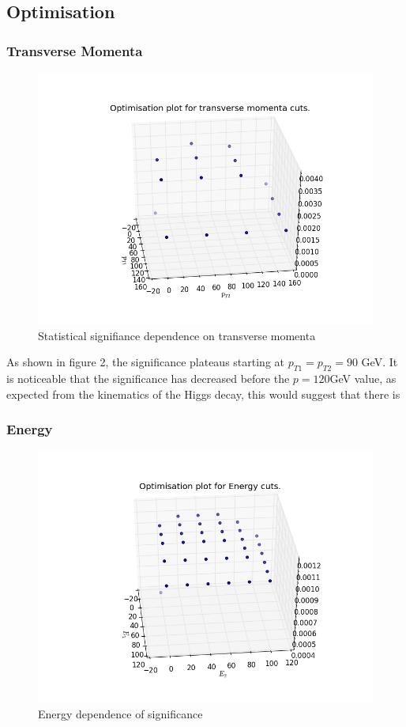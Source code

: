 \documentclass{article}
\begin{document}
\subsection{Optimisation}
\subsubsection{Transverse Momenta}
\begin{figure}
\includegraphics[scale=0.5]{transverse6}
\caption{Statistical signifiance dependence on transverse momenta}
\end{figure}

As shown in figure 2, the significance plateaus starting at $p_{T1} = p_{T2} = 90$ GeV. It is noticeable that the significance has decreased before the $p = 120$GeV value, as expected from the kinematics of the Higgs decay, this would suggest that there is 
\subsubsection{Energy}
\begin{figure}
\includegraphics[scale=0.5]{energy6}
\caption{Energy dependence of significance}
\end{figure}
\end{document}
